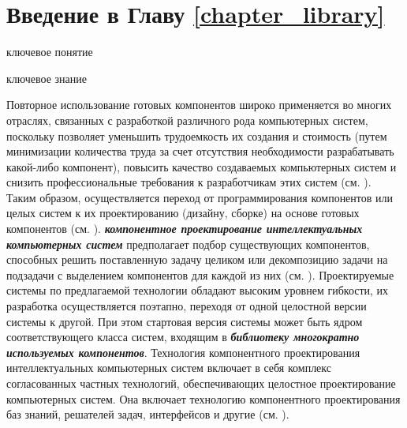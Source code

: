 \section*{Введение в Главу \ref{chapter_library}}
\label{ostis_library_introduction}

\begin{SCn}
\begin{scnrelfromlist}{ключевое понятие}
\end{scnrelfromlist}
\end{SCn}

\bigskip

\begin{SCn}
\begin{scnrelfromlist}{ключевое знание}
\end{scnrelfromlist}
\end{SCn}

\bigskip

Повторное использование готовых компонентов широко применяется во многих отраслях, связанных с разработкой различного рода компьютерных систем, поскольку позволяет уменьшить трудоемкость их создания и стоимость (путем минимизации количества труда за счет отсутствия необходимости разрабатывать какой-либо компонент), повысить качество создаваемых компьютерных систем и снизить профессиональные требования к разработчикам этих систем (см. ). Таким образом, осуществляется переход от программирования компонентов или целых систем к их проектированию (дизайну, сборке) на основе готовых компонентов (см. ). \textbf{\textit{компонентное проектирование интеллектуальных компьютерных систем}} предполагает подбор существующих компонентов, способных решить поставленную задачу целиком или декомпозицию задачи на подзадачи с выделением компонентов для каждой из них (см. ). Проектируемые системы по предлагаемой технологии обладают высоким уровнем гибкости, их разработка осуществляется поэтапно, переходя от одной целостной версии системы к другой. При этом стартовая версия системы может быть ядром соответствующего класса систем, входящим в \textbf{\textit{библиотеку многократно используемых компонентов}}. Технология компонентного проектирования интеллектуальных компьютерных систем включает в себя комплекс согласованных частных технологий, обеспечивающих целостное проектирование компьютерных систем. Она включает технологию компонентного проектирования баз знаний, решателей задач, интерфейсов и другие (см. ). 

